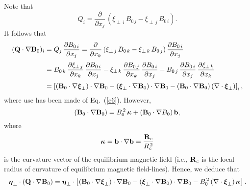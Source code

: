 \documentclass[12pt,prb,aps,notitlepage]{revtex4-1}
\newcommand{\bxi}{\mbox{\boldmath$\xi$}}
\newcommand{\bta}{\mbox{\boldmath$\eta$}}
\newcommand{\bkappa}{\mbox{\boldmath$\kappa$}}
\begin{document}
Note that
\begin{equation}\label{e47}
Q_i = \frac{\partial}{\partial x_j}\,(\xi_{\perp\,i}\,B_{0\,j} - \xi_{\perp\,j}\,B_{0\,i}).
\end{equation}
It follows that
\begin{align}
({\bf Q}\cdot\nabla {\bf B}_0)_i&= Q_j\,\frac{\partial B_{0\,i}}{\partial x_j} 
= \frac{\partial}{\partial x_k}\,(\xi_{\perp\,j}\,B_{0\,k} - \xi_{\perp\,k}\,B_{0\,j})\,\frac{\partial B_{0\,i}}{\partial x_j}\nonumber\\[0.5ex]
&= B_{0\,k}\,\frac{\partial\xi_{\perp\,j}}{\partial x_k}\,\frac{\partial B_{0\,i}}{\partial x_j}-\xi_{\perp\,k}\,\frac{\partial B_{0\,j}}{\partial x_k}\,\frac{\partial B_{0\,i}}{\partial x_j}
-B_{0\,j}\,\frac{\partial B_{0\,i}}{\partial x_j}\,\frac{\partial \xi_{\perp\,k}}{\partial x_k} \nonumber\\[0.5ex]
&= \left[ ({\bf B}_0\cdot
\nabla\bxi_\perp)\cdot\nabla {\bf B}_0 - (\bxi_\perp\cdot \nabla{\bf B}_0)\cdot\nabla {\bf B}_0- ({\bf B}_0\cdot\nabla {\bf B}_0)\,(\nabla\cdot\bxi_\perp)\right]_i,
\end{align}
where use has been made of Eq.~(\ref{e6}). However,
\begin{equation}\label{e49}
({\bf B}_0\cdot\nabla {\bf B}_0) = B_0^{\,2}\,\bkappa+ ({\bf B}_0\cdot\nabla B_0)\,{\bf b},
\end{equation}
where
\begin{equation}
\bkappa = {\bf b}\cdot\nabla {\bf b} = \frac{{\bf R}_c}{R_c^{\,2}}
\end{equation}
is the curvature vector of the equilibrium magnetic field (i.e., ${\bf R}_c$ is the local radius of curvature of equilibrium magnetic field-lines).
Hence, we deduce that
\begin{equation}\label{e51}
\bta_\perp \cdot({\bf Q}\cdot\nabla {\bf B}_0)= \bta_\perp\cdot\left[({\bf B}_0\cdot
\nabla\bxi_\perp)\cdot\nabla {\bf B}_0 - (\bxi_\perp\cdot \nabla{\bf B}_0)\cdot\nabla {\bf B}_0- B_0^{\,2}\,(\nabla\cdot\bxi_\perp)\,\bkappa\right].
\end{equation}
\end{document}
